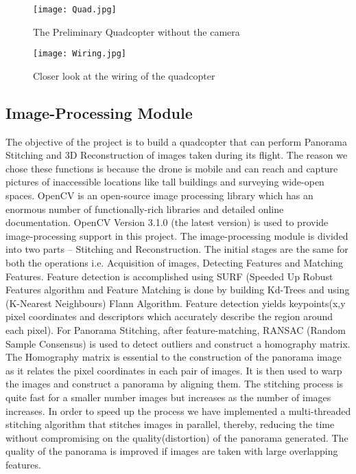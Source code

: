 \begin{figure}[H]
  \centering
  \texttt{[image: Quad.jpg]}
  \caption{The Preliminary Quadcopter without the camera}
  \label{first quadcopter}	
\end{figure}

\begin{figure}[H]
  \centering
  \texttt{[image: Wiring.jpg]}
  \caption{Closer look at the wiring of the quadcopter}
  \label{second quadcopter}	
\end{figure}



\subsection{Image-Processing Module}
The objective of the project is to build a quadcopter that can perform Panorama Stitching and 3D Reconstruction of images taken during its flight. The reason we chose these functions is because the drone is mobile and can reach and capture pictures of inaccessible locations like tall buildings and surveying wide-open spaces. OpenCV is an open-source image processing library which has an enormous number of functionally-rich libraries and detailed online documentation. OpenCV  Version 3.1.0 (the latest version) is used to provide image-processing support in this project.
The image-processing module is divided into two parts – Stitching and Reconstruction. The initial stages are the same for both the operations i.e. Acquisition of images, Detecting Features and Matching Features. Feature detection is accomplished using SURF (Speeded Up Robust Features  algorithm and Feature Matching is done by building Kd-Trees and using (K-Nearest Neighbours) Flann Algorithm. Feature detection yields keypoints(x,y pixel coordinates and descriptors which accurately describe the region around each pixel).
For Panorama Stitching, after feature-matching, RANSAC (Random Sample Consensus) is used to detect outliers and construct a homography matrix. The Homography matrix is essential to the construction of the panorama image as it relates the pixel coordinates in each pair of images. It is then used to warp the images and construct a panorama by aligning them. The stitching process is quite fast for a smaller number images but increases as the number of images increases. In order to speed up the process we have implemented a multi-threaded stitching algorithm that stitches images in parallel, thereby, reducing the time without compromising on the quality(distortion) of the panorama generated. The quality of the panorama is improved if images are taken with large overlapping features.

